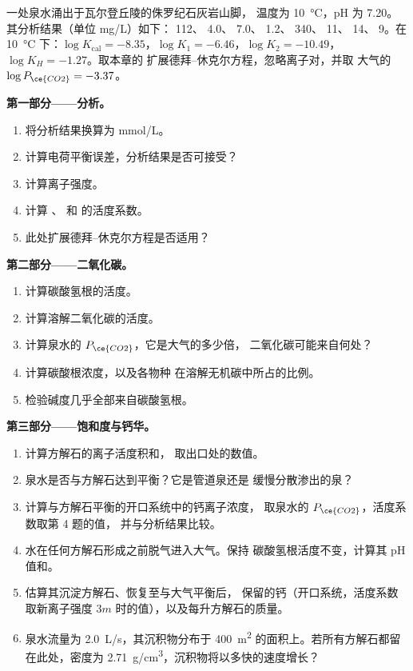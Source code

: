 \begin{problem}
\label{pb:b3:water-rock-interaction:1}
一处泉水涌出于瓦尔登丘陵的侏罗纪石灰岩山脚，
温度为 \qty{10}{\celsius}，pH 为 7.20。其分析结果（单位 \unit{mg/L}）如下：
112、 4.0、 7.0、 1.2、 340、 11、
 14、 9。在 \qty{10}{\celsius} 下：$\log K_{\mathrm{cal}} =
-8.35$，$\log K_1 = -6.46$，$\log K_2 = -10.49$，$\log K_H = -1.27$。取本章的
扩展德拜–休克尔方程，忽略离子对，并取
大气的 $\log P_{\ce{CO2}} = -3.37$。

\medskip\noindent\textbf{第一部分——分析。}
\begin{enumerate}
\item 将分析结果换算为 \unit{mmol/L}。
\item 计算电荷平衡误差，分析结果是否可接受？
\item 计算离子强度。
\item 计算 、 和
   的活度系数。
\item 此处扩展德拜–休克尔方程是否适用？
\end{enumerate}

\medskip\noindent\textbf{第二部分——二氧化碳。}
\begin{enumerate}[resume]
\item 计算碳酸氢根的活度。
\item 计算溶解二氧化碳的活度。
\item 计算泉水的 $P_{\ce{CO2}}$，它是大气的多少倍，
  二氧化碳可能来自何处？
\item 计算碳酸根浓度，以及各物种
  在溶解无机碳中所占的比例。
\item 检验碱度几乎全部来自碳酸氢根。
\end{enumerate}

\medskip\noindent\textbf{第三部分——饱和度与钙华。}
\begin{enumerate}[resume]
\item 计算方解石的离子活度积和，
  取出口处的数值。
\item 泉水是否与方解石达到平衡？它是管道泉还是
  缓慢分散渗出的泉？
\item 计算与方解石平衡的开口系统中的钙离子浓度，
  取泉水的 $P_{\ce{CO2}}$，活度系数取第 4 题的值，
  并与分析结果比较。
\item 水在任何方解石形成之前脱气进入大气。保持
  碳酸氢根活度不变，计算其 pH 值和。
\item 估算其沉淀方解石、恢复至与大气平衡后，
  保留的钙（开口系统，活度系数取新离子强度
  $3m$ 时的值），以及每升方解石的质量。
\item 泉水流量为 \qty{2.0}{L/s}，其沉积物分布于
  \qty{400}{m^2} 的面积上。若所有方解石都留在此处，密度为
  \qty{2.71}{g/cm^3}，沉积物将以多快的速度增长？
\end{enumerate}


\end{problem}
